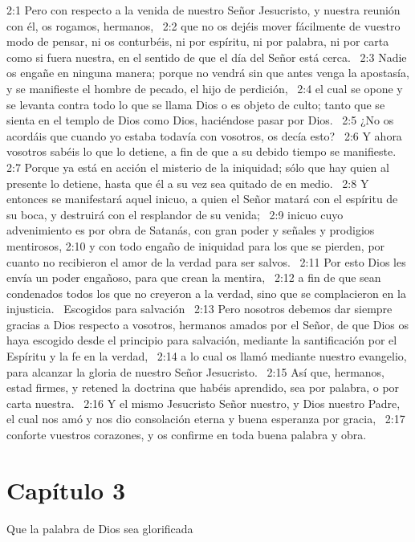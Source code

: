 2:1 Pero con respecto a la venida de nuestro Señor Jesucristo, y nuestra reunión con él, os rogamos, hermanos,  
2:2 que no os dejéis mover fácilmente de vuestro modo de pensar, ni os conturbéis, ni por espíritu, ni por palabra, ni por carta como si fuera nuestra, en el sentido de que el día del Señor está cerca.  
2:3 Nadie os engañe en ninguna manera; porque no vendrá sin que antes venga la apostasía, y se manifieste el hombre de pecado, el hijo de perdición,  
2:4 el cual se opone y se levanta contra todo lo que se llama Dios o es objeto de culto; tanto que se sienta en el templo de Dios como Dios, haciéndose pasar por Dios.  
2:5 ¿No os acordáis que cuando yo estaba todavía con vosotros, os decía esto?  
2:6 Y ahora vosotros sabéis lo que lo detiene, a fin de que a su debido tiempo se manifieste.  
2:7 Porque ya está en acción el misterio de la iniquidad; sólo que hay quien al presente lo detiene, hasta que él a su vez sea quitado de en medio.  
2:8 Y entonces se manifestará aquel inicuo, a quien el Señor matará con el espíritu de su boca, y destruirá con el resplandor de su venida;  
2:9 inicuo cuyo advenimiento es por obra de Satanás, con gran poder y señales y prodigios mentirosos, 
2:10 y con todo engaño de iniquidad para los que se pierden, por cuanto no recibieron el amor de la verdad para ser salvos.  
2:11 Por esto Dios les envía un poder engañoso, para que crean la mentira,  
2:12 a fin de que sean condenados todos los que no creyeron a la verdad, sino que se complacieron en la injusticia.  
Escogidos para salvación  
2:13 Pero nosotros debemos dar siempre gracias a Dios respecto a vosotros, hermanos amados por el Señor, de que Dios os haya escogido desde el principio para salvación, mediante la santificación por el Espíritu y la fe en la verdad,  
2:14 a lo cual os llamó mediante nuestro evangelio, para alcanzar la gloria de nuestro Señor Jesucristo.  
2:15 Así que, hermanos, estad firmes, y retened la doctrina que habéis aprendido, sea por palabra, o por carta nuestra.  
2:16 Y el mismo Jesucristo Señor nuestro, y Dios nuestro Padre, el cual nos amó y nos dio consolación eterna y buena esperanza por gracia,  
2:17 conforte vuestros corazones, y os confirme en toda buena palabra y obra.  
\section*{Capítulo 3}
Que la palabra de Dios sea glorificada  

